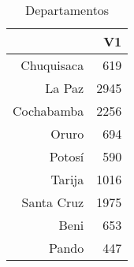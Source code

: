 \begin{table}[ht]
\centering
\begin{tabular}{rr}
  \hline
 & V1 \\ 
  \hline
Chuquisaca & 619 \\ 
  La Paz & 2945 \\ 
  Cochabamba & 2256 \\ 
  Oruro & 694 \\ 
  Potosí & 590 \\ 
  Tarija & 1016 \\ 
  Santa Cruz & 1975 \\ 
  Beni & 653 \\ 
  Pando & 447 \\ 
   \hline
\end{tabular}
\caption{Departamentos} 
\end{table}
